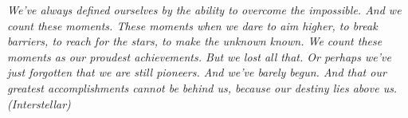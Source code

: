 \begin{epigrafe}
    \vspace*{\fill}
    \begin{flushright}
        \textit{We've always defined ourselves by the ability to overcome the impossible. And we count these moments. These moments when we dare to aim higher, to break barriers, to reach for the stars, to make the unknown known. We count these moments as our proudest achievements. But we lost all that. Or perhaps we've just forgotten that we are still pioneers. And we've barely begun. And that our greatest accomplishments cannot be behind us, because our destiny lies above us.
        (Interstellar)}
    \end{flushright}
\end{epigrafe}
